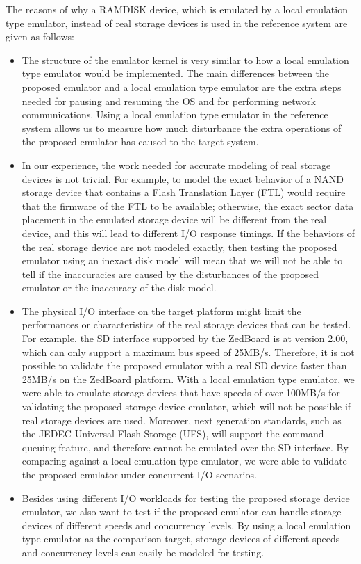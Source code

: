 The reasons of why a RAMDISK device, which is emulated by a local emulation type emulator, instead of real storage devices is used in the reference system are given as follows:

\begin{itemize}
	\item The structure of the emulator kernel is very similar to how a local emulation type emulator would be implemented. The main differences between the proposed emulator and a local emulation type emulator are the extra steps needed for pausing and resuming the OS and for performing network communications. Using a local emulation type emulator in the reference system allows us to measure how much disturbance the extra operations of the proposed emulator has caused to the target system.
	
	\item In our experience, the work needed for accurate modeling of real storage devices is not trivial. For example, to model the exact behavior of a NAND storage device that contains a Flash Translation Layer (FTL) would require that the firmware of the FTL to be available; otherwise, the exact sector data placement in the emulated storage device will be different from the real device, and this will lead to different I/O response timings. If the behaviors of the real storage device are not modeled exactly, then testing the proposed emulator using an inexact disk model will mean that we will not be able to tell if the inaccuracies are caused by the disturbances of the proposed emulator or the inaccuracy of the disk model.
	
	\item The physical I/O interface on the target platform might limit the performances or characteristics of the real storage devices that can be tested. For example, the SD interface supported by the ZedBoard is at version 2.00, which can only support a maximum bus speed of 25MB/s. Therefore, it is not possible to validate the proposed emulator with a real SD device faster than 25MB/s on the ZedBoard platform. With a local emulation type emulator, we were able to emulate storage devices that have speeds of over 100MB/s for validating the proposed storage device emulator, which will not be possible if real storage devices are used. Moreover, next generation standards, such as the JEDEC Universal Flash Storage (UFS), will support the command queuing feature, and therefore cannot be emulated over the SD interface. By comparing against a local emulation type emulator, we were able to validate the proposed emulator under concurrent I/O scenarios.
	
	\item Besides using different I/O workloads for testing the proposed storage device emulator, we also want to test if the proposed emulator can handle storage devices of different speeds and concurrency levels. By using a local emulation type emulator as the comparison target, storage devices of different speeds and concurrency levels can easily be modeled for testing.
\end{itemize}
 
